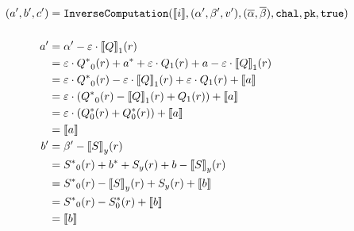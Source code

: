 \documentclass[11pt]{report}
\theoremstyle{definition}
\theoremstyle{plain}
\begin{document}
\begin{align*}
  (a', b', c') & = \texttt{InverseComputation}(\llbracket i \rrbracket, (\alpha', \beta', v'),
  (\overline{\alpha}, \overline{\beta}), \texttt{chal}, \texttt{pk}, \texttt{true})                                    \\\\
  a'           & = \alpha' - \varepsilon \cdot {\ensuremath{\llbracket Q \rrbracket}}_1(r)                                                           \\
               & = \varepsilon \cdot {Q^*}_0(r) + a^* + \varepsilon \cdot Q_1(r) + a - \varepsilon \cdot {\ensuremath{\llbracket Q \rrbracket}}_1(r) \\
               & = \varepsilon \cdot {Q^*}_0(r) - \varepsilon \cdot {\ensuremath{\llbracket Q \rrbracket}}_1(r) + \varepsilon \cdot Q_1(r) + \llbracket a \rrbracket  \\
               & = \varepsilon \cdot ({Q^*}_0(r) - {\llbracket Q \rrbracket}_1(r) +  Q_1(r)) + \llbracket a \rrbracket                                   \\
               & = \varepsilon \cdot (Q^*_0(r) +  Q^*_0(r)) + \llbracket a \rrbracket                                                   \\
               & = \llbracket a \rrbracket                                                                                              \\
  b'           & = \beta' - {\llbracket S \rrbracket}_y(r)                                                                              \\
               & = {S^*}_0(r) + b^* + S_y(r) + b - {\llbracket S \rrbracket}_y(r)                                                       \\
               & = {S^*}_0(r) - {\llbracket S \rrbracket}_y(r) + S_y(r)  + \llbracket b \rrbracket                                                       \\
               & = {S^*}_0(r) - S^*_0(r)  + \llbracket b \rrbracket                                                                     \\
               & = \llbracket b \rrbracket                                                                                              \\
\end{align*}
\end{document}

